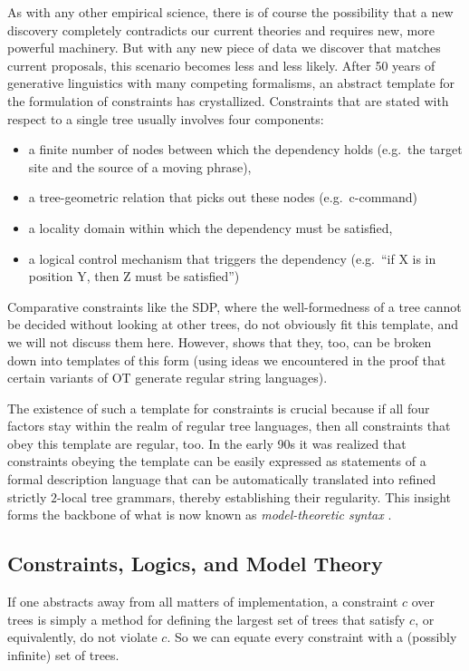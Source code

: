 As with any other empirical science, there is of course the possibility that a new discovery completely contradicts our current theories and requires new, more powerful machinery.
But with any new piece of data we discover that matches current proposals, this scenario becomes less and less likely.
After 50 years of generative linguistics with many competing formalisms, an abstract template for the formulation of constraints has crystallized.
Constraints that are stated with respect to a single tree usually involves four components:
%
\begin{itemize}
    \item a finite number of nodes between which the dependency holds (e.g.\ the target site and the source of a moving phrase),
    \item a tree-geometric relation that picks out these nodes (e.g.\ c-command)
    \item a locality domain within which the dependency must be satisfied,
    \item a logical control mechanism that triggers the dependency (e.g.\ ``if X is in position Y, then Z must be satisfied'')
\end{itemize}
%
Comparative constraints like the SDP, where the well-formedness of a tree cannot be decided without looking at other trees, do not obviously fit this template, and we will not discuss them here.
However, \citet{Graf13Thesis} shows that they, too, can be broken down into templates of this form (using ideas we encountered in the proof that certain variants of OT generate regular string languages).

The existence of such a template for constraints is crucial because if all four factors stay within the realm of regular tree languages, then all constraints that obey this template are regular, too.
In the early 90s it was realized that constraints obeying the template can be easily expressed as statements of a formal description language that can be automatically translated into refined strictly $2$-local tree grammars, thereby establishing their regularity.
This insight forms the backbone of what is now known as \emph{model-theoretic syntax} \citep{Blackburn.etal93,Backofen.etal95,Kracht97,Rogers98,PottsPullum02,Pullum07}.

\subsection{Constraints, Logics, and Model Theory}

If one abstracts away from all matters of implementation, a constraint $c$ over trees is simply a method for defining the largest set of trees that satisfy $c$, or equivalently, do not violate $c$.
So we can equate every constraint with a (possibly infinite) set of trees.


